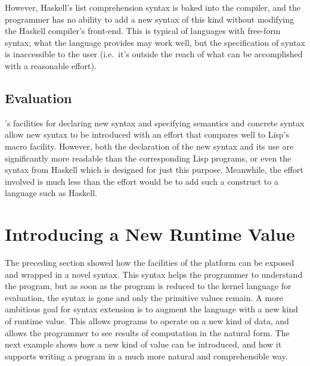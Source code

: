However, Haskell's list comprehension syntax is baked into the compiler, and the programmer has no ability to add a new syntax of this kind without modifying the Haskell compiler's front-end. This is typical of languages with free-form syntax; what the language provides may work well, but the specification of syntax is inaccessible to the user (i.e.~it's outside the reach of what can be accomplished with a reasonable effort).

\subsection{Evaluation}
\Meta's facilities for declaring new syntax and specifying semantics and concrete syntax allow new syntax to be introduced with an effort that compares well to Lisp's macro facility. However, both the declaration of the new syntax and its use are significantly more readable than the corresponding Lisp programs, or even the syntax from Haskell which is designed for just this purpose. Meanwhile, the effort involved is much less than the effort would be to add such a construct to a language such as Haskell.


%
%
\section{Introducing a New Runtime Value}
The preceding section showed how the facilities of the platform can be exposed and wrapped in a novel syntax. This syntax helps the programmer to understand the program, but as soon as the program is reduced to the kernel language for evaluation, the syntax is gone and only the primitive values remain. A more ambitious goal for syntax extension is to augment the language with a new kind of runtime value. This allows programs to operate on a new kind of data, and allows the programmer to see results of computation in the natural form. The next example shows how a new kind of value can be introduced, and how it supports writing a program in a much more natural and comprehensible way.

